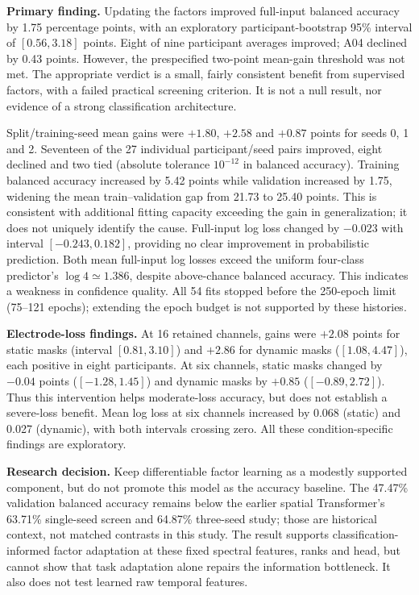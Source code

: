 \textbf{Primary finding.} Updating the factors improved full-input balanced
accuracy by 1.75 percentage points, with an exploratory participant-bootstrap
95\% interval of $[0.56,3.18]$ points. Eight of nine participant averages improved;
A04 declined by 0.43 points. However, the prespecified two-point mean-gain
threshold was not met. The appropriate verdict is a small, fairly consistent
benefit from supervised factors, with a failed practical screening criterion.
It is not a null result, nor evidence of a strong classification architecture.

Split/training-seed mean gains were $+1.80$, $+2.58$ and $+0.87$ points for
seeds 0, 1 and 2. Seventeen of the 27 individual participant/seed pairs improved,
eight declined and two tied (absolute tolerance $10^{-12}$ in balanced accuracy).
Training balanced accuracy increased by 5.42 points while validation increased
by 1.75, widening the mean train--validation gap from 21.73 to 25.40 points.
This is consistent with additional fitting capacity exceeding the gain in
generalization; it does not uniquely identify the cause. Full-input log loss
changed by $-0.023$ with interval $[-0.243,0.182]$, providing no clear improvement
in probabilistic prediction. Both mean full-input log losses exceed the uniform
four-class predictor's $\log 4\simeq1.386$, despite above-chance balanced accuracy.
This indicates a weakness in confidence quality. All 54 fits stopped before
the 250-epoch limit (75--121 epochs); extending the epoch budget is not supported
by these histories.

\textbf{Electrode-loss findings.} At 16 retained channels, gains were
$+2.08$ points for static masks (interval $[0.81,3.10]$) and $+2.86$ for dynamic
masks ($[1.08,4.47]$), each positive in eight participants. At six channels,
static masks changed by $-0.04$ points ($[-1.28,1.45]$) and dynamic masks by
$+0.85$ ($[-0.89,2.72]$). Thus this intervention helps moderate-loss accuracy,
but does not establish a severe-loss benefit. Mean log loss at six channels
increased by 0.068 (static) and 0.027 (dynamic), with both intervals crossing
zero. All these condition-specific findings are exploratory.

\textbf{Research decision.} Keep differentiable factor learning as a modestly
supported component, but do not promote this model as the accuracy baseline.
The 47.47\% validation balanced accuracy remains below the earlier spatial
Transformer's 63.71\% single-seed screen and 64.87\% three-seed study; those are
historical context, not matched contrasts in this study. The result supports
classification-informed factor adaptation at these fixed spectral features,
ranks and head, but cannot show that task adaptation alone repairs the
information bottleneck. It also does not test learned raw temporal features.

